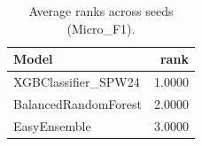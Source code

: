 \begin{table}[t]
\centering
\begin{tabular}{lr}
\toprule
Model & rank \\
\midrule
XGBClassifier_SPW24 & 1.0000 \\
BalancedRandomForest & 2.0000 \\
EasyEnsemble & 3.0000 \\
\bottomrule
\end{tabular}
\caption{Average ranks across seeds (Micro_F1).}
\label{tab:avg_rank_Micro_F1}
\end{table}